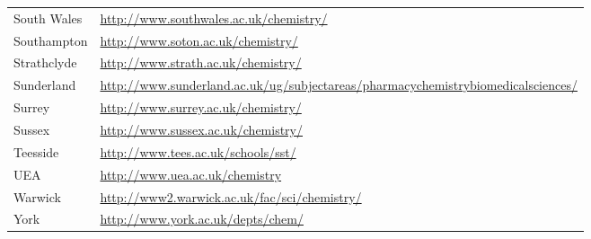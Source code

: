 \begin{table}[H]
\begin{tabular}{||p{4cm}|Y||}
 \footnotesize{South Wales  }                      & \footnotesize{\url{http://www.southwales.ac.uk/chemistry/}}                                                                                               \\
 \footnotesize{Southampton }                       & \footnotesize{\url{http://www.soton.ac.uk/chemistry/}}                                                                                                    \\
 \footnotesize{Strathclyde}                        & \footnotesize{\url{http://www.strath.ac.uk/chemistry/}}                                                                                                   \\
 \footnotesize{Sunderland}                         & \footnotesize{\url{http://www.sunderland.ac.uk/ug/subjectareas/pharmacychemistrybiomedicalsciences/}}                                                     \\
 \footnotesize{Surrey }                            & \footnotesize{\url{http://www.surrey.ac.uk/chemistry/}}                                                                                                   \\
 \footnotesize{Sussex                            } & \footnotesize{\url{http://www.sussex.ac.uk/chemistry/}}                                                                                                   \\
 \footnotesize{Teesside                         }  & \footnotesize{\url{http://www.tees.ac.uk/schools/sst/}}                                                                                                   \\
 \footnotesize{UEA                             }   & \footnotesize{\url{http://www.uea.ac.uk/chemistry}}                                                                                                       \\
 \footnotesize{Warwick                        }    & \footnotesize{\url{http://www2.warwick.ac.uk/fac/sci/chemistry/}}                                                                                         \\
 \footnotesize{York                          }     & \footnotesize{\url{http://www.york.ac.uk/depts/chem/}}                                                                                                   \\ \hline
\end{tabular}
\end{table}


